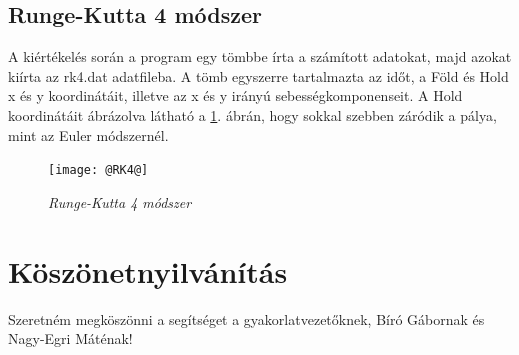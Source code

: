 \documentclass[a4paper, 12pt]{article}
\begin{document}
\subsection{Runge-Kutta 4 módszer}
\label{subsec:rk4_2}
A kiértékelés során a program egy tömbbe írta a számított adatokat, majd azokat kiírta az rk4.dat adatfileba. A tömb egyszerre tartalmazta az időt, a Föld és Hold x és y koordinátáit, illetve az x és y irányú sebességkomponenseit. A Hold koordinátáit ábrázolva látható a \ref{fig:rk4}. ábrán, hogy sokkal szebben záródik a pálya, mint az Euler módszernél.

\begin{figure}
\begin{center}
\texttt{[image: @RK4@]}
  \caption{\textit{Runge-Kutta 4 módszer}}
\label{fig:rk4}
\end{center}
\end{figure}


\cleardoublepage
\vspace*{2cm}

\section*{Köszönetnyilvánítás}
Szeretném megköszönni a segítséget a gyakorlatvezetőknek, Bíró Gábornak és Nagy-Egri Máténak!


\newpage \vspace*{2cm}


       
       
%
% 
\end{document}
